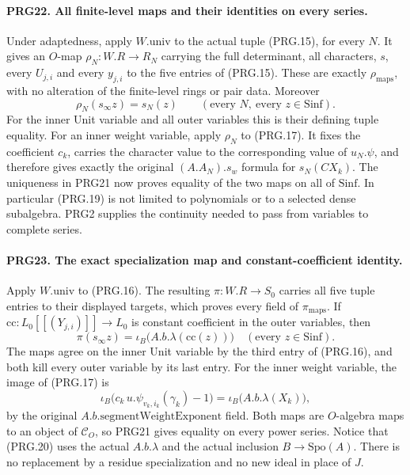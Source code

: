 \paragraph{PRG22. All finite-level maps and their identities on every series.}
\label{claim:PRG22}
Under adaptedness, apply \(W.\mathrm{univ}\) to the actual tuple
(PRG.15), for every \(N\). It gives an \(O\)-map
\(\rho_N:W.R\to R_N\) carrying the full determinant, all
characters, \(s\), every \(U_{j,i}\) and every \(y_{j,i}\)
to the five entries of (PRG.15). These are exactly
\(\rho_{\mathrm{maps}}\), with no alteration of the finite-level
rings or pair data. Moreover
\[
 \rho_N(s_\infty z)=s_N(z)\qquad
       (\text{every }N,\ \text{every }z\in\mathrm{Sinf}).   \tag{PRG.19}
\]
For the inner Unit variable and all outer variables this is their
defining tuple equality. For an inner weight variable, apply
\(\rho_N\) to (PRG.17). It fixes the coefficient \(c_k\),
carries the character value to the corresponding value of
\(u_N.\psi\), and therefore gives exactly the original
\((A.A_N).s_w\) formula for \(s_N(CX_k)\). The uniqueness in
PRG21 now proves equality of the two maps on all of
\(\mathrm{Sinf}\). In particular (PRG.19) is not limited to
polynomials or to a selected dense subalgebra. PRG2 supplies the
continuity needed to pass from variables to complete series.

\paragraph{PRG23. The exact specialization map and constant-coefficient identity.}
\label{claim:PRG23}
Apply \(W.\mathrm{univ}\) to (PRG.16). The resulting
\(\pi:W.R\to S_0\) carries all five tuple entries to their
displayed targets, which proves every field of
\(\pi_{\mathrm{maps}}\). If
\(\mathrm{cc}:L_0[[(Y_{j,i})]]\to L_0\) is constant
coefficient in the outer variables, then
\[
 \pi(s_\infty z)=\iota_B\bigl(A.b.\lambda(\mathrm{cc}(z))\bigr)
       \quad(\text{every }z\in\mathrm{Sinf}).              \tag{PRG.20}
\]
The maps agree on the inner Unit variable by the third entry of
(PRG.16), and both kill every outer variable by its last entry.
For the inner weight variable, the image of (PRG.17) is
\[
 \iota_B\bigl(c_k\,u.\psi_{v_k,i_k}(\gamma_k)-1\bigr)
       =\iota_B\bigl(A.b.\lambda(X_k)\bigr),
\]
by the original \(A.b.\mathrm{segmentWeightExponent}\) field.
Both maps are \(O\)-algebra maps to an object of
\(\mathcal C_O\), so PRG21 gives equality on every power
series. Notice that (PRG.20) uses the actual \(A.b.\lambda\)
and the actual inclusion \(B\to\mathrm{Spo}(A)\).
There is no replacement by a residue specialization and no new
ideal in place of \(J\).


